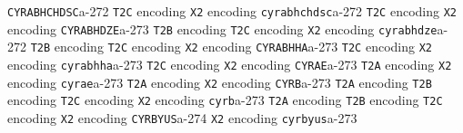 \documentclass[twoside]{ltxdoc}
\makeatletter
\renewenvironment{theindex}{%
   \@restonecoltrue
   \if@twocolumn\@restonecolfalse\fi
   \columnseprule \z@
   \columnsep 35\p@
   \twocolumn[\index@prologue]%
   \IndexParms
   \let\item\@idxitem
   \ignorespaces
}{\if@restonecol\onecolumn\else\clearpage\fi}
\makeatother
\begin{document}
\begin{theindex}
  \item \texttt  {CYRABHCHDSC}\pfill a-272
    \subitem \texttt  {T2C} encoding\pfill {}
    \subitem \texttt  {X2} encoding\pfill {}
  \item \texttt  {cyrabhchdsc}\pfill a-272
    \subitem \texttt  {T2C} encoding\pfill {}
    \subitem \texttt  {X2} encoding\pfill {}
  \item \texttt  {CYRABHDZE}\pfill a-273
    \subitem \texttt  {T2B} encoding\pfill {}
    \subitem \texttt  {T2C} encoding\pfill {}
    \subitem \texttt  {X2} encoding\pfill {}
  \item \texttt  {cyrabhdze}\pfill a-272
    \subitem \texttt  {T2B} encoding\pfill {}
    \subitem \texttt  {T2C} encoding\pfill {}
    \subitem \texttt  {X2} encoding\pfill {}
  \item \texttt  {CYRABHHA}\pfill a-273
    \subitem \texttt  {T2C} encoding\pfill {}
    \subitem \texttt  {X2} encoding\pfill {}
  \item \texttt  {cyrabhha}\pfill a-273
    \subitem \texttt  {T2C} encoding\pfill {}
    \subitem \texttt  {X2} encoding\pfill {}
  \item \texttt  {CYRAE}\pfill a-273
    \subitem \texttt  {T2A} encoding\pfill {}
    \subitem \texttt  {X2} encoding\pfill {}
  \item \texttt  {cyrae}\pfill a-273
    \subitem \texttt  {T2A} encoding\pfill {}
    \subitem \texttt  {X2} encoding\pfill {}
  \item \texttt  {CYRB}\pfill a-273
    \subitem \texttt  {T2A} encoding\pfill {}
    \subitem \texttt  {T2B} encoding\pfill {}
    \subitem \texttt  {T2C} encoding\pfill {}
    \subitem \texttt  {X2} encoding\pfill {}
  \item \texttt  {cyrb}\pfill a-273
    \subitem \texttt  {T2A} encoding\pfill {}
    \subitem \texttt  {T2B} encoding\pfill {}
    \subitem \texttt  {T2C} encoding\pfill {}
    \subitem \texttt  {X2} encoding\pfill {}
  \item \texttt  {CYRBYUS}\pfill a-274
    \subitem \texttt  {X2} encoding\pfill {}
  \item \texttt  {cyrbyus}\pfill a-273

\end{theindex}
\end{document}
